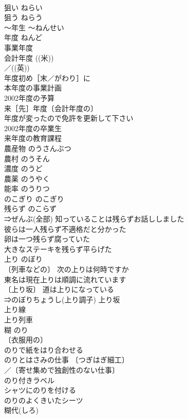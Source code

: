 \documentclass[8pt]{extreport}
\begin{document}
\begin{CJK}{UTF8}{min}
\\	狙い	ねらい	
\\	狙う	ねらう	
\\	～年生	～ねんせい	
\\	年度	ねんど	
\\	事業年度 
\\	会計年度 ((米))
\\	／((英))
\\	年度初め［末／がわり］に 
\\	本年度の事業計画 
\\	2002年度の予算 
\\	来［先］年度〔会計年度の〕 
\\	年度が変ったので免許を更新して下さい 
\\	2002年度の卒業生 
\\	来年度の教育課程 
\\	農産物	のうさんぶつ	
\\	農村	のうそん	
\\	濃度	のうど	
\\	農薬	のうやく	
\\	能率	のうりつ	
\\	のこぎり	のこぎり	
\\	残らず	のこらず	
\\	⇒ぜんぶ(全部) 知っていることは残らずお話ししました 
\\	彼らは一人残らず不適格だと分かった 
\\	卵は一つ残らず腐っていた 
\\	大きなステーキを残らず平らげた 
\\	上り	のぼり	
\\	〔列車などの〕 次の上りは何時ですか 
\\	東名は現在上りは順調に流れています 
\\	〔上り坂〕 道は上りになっている 
\\	⇒のぼりちょうし(上り調子) 上り坂 
\\	上り線 
\\	上り列車 
\\	糊	のり	
\\	〔衣服用の〕
\\	のりで紙をはり合わせる 
\\	のりとはさみの仕事 〔つぎはぎ細工〕
\\	／〔寄せ集めで独創性のない仕事〕
\\	のり付きラベル 
\\	シャツにのりを付ける 
\\	のりのよくきいたシーツ 
\\	糊代(しろ) 

\end{CJK}
\end{document}
